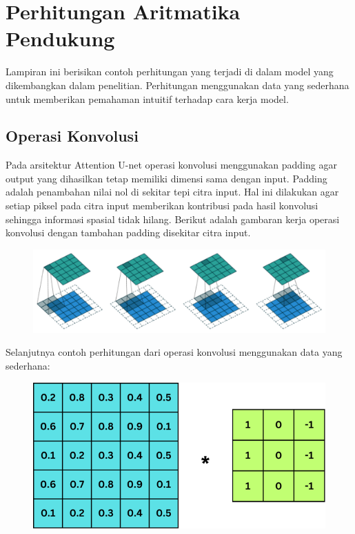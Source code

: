 \chapter{Perhitungan Aritmatika Pendukung}

\noindent Lampiran ini berisikan contoh perhitungan yang terjadi di dalam model yang dikembangkan dalam penelitian. Perhitungan menggunakan data yang sederhana untuk memberikan pemahaman intuitif terhadap cara kerja model. 

\section{Operasi Konvolusi}
\noindent Pada arsitektur Attention U-net operasi konvolusi menggunakan padding agar output yang dihasilkan tetap memiliki dimensi sama dengan input. Padding adalah penambahan nilai nol di sekitar tepi citra input. Hal ini dilakukan agar setiap piksel pada citra input memberikan kontribusi pada hasil konvolusi sehingga informasi spasial tidak hilang. Berikut adalah gambaran kerja operasi konvolusi dengan tambahan padding disekitar citra input.

\begin{figure}[H]
	\centering
	\includegraphics[scale=.4]{gambar/lampiran/stride.png}
\end{figure}

\noindent Selanjutnya contoh perhitungan dari operasi konvolusi menggunakan data yang sederhana:

\begin{figure}[H]
	\centering
	\includegraphics[scale=.3]{gambar/lampiran/konvolusi.png}
\end{figure}

